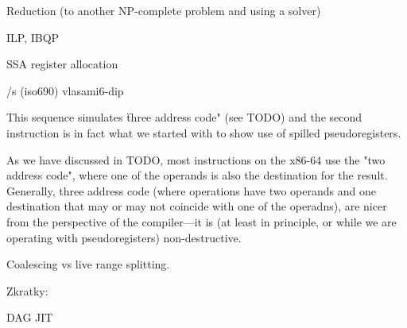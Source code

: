 \secc Reduction (to another NP-complete problem and using a solver)

ILP, IBQP

\secc SSA register allocation


\bibchap
\usebib/s (iso690) vlasami6-dip

\bye

This sequence simulates \"three address code" (see TODO) and the second instruction
is in fact what we started with to show use of spilled pseudoregisters.


As we have discussed in TODO, most instructions on
the x86-64 use the "two address code", where one of the operands is also the
destination for the result. Generally, three address code (where operations have
two operands and one destination that may or may not coincide with one of the
operadns), are nicer from the perspective of the compiler---it is (at least in
principle, or while we are operating with pseudoregisters) non-destructive.





Coalescing vs live range splitting.



Zkratky:

DAG
JIT
